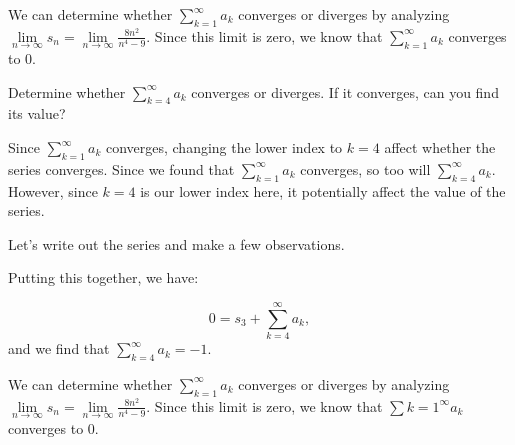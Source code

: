 \documentclass{ximera}
\begin{document}
\begin{example}
\begin{question}
\begin{explanation}
We can determine whether $\sum\limits_{k=1}^{\infty} a_k$ converges or diverges by analyzing $\lim\limits_{n \to \infty} s_n = \lim\limits_{n \to \infty} \frac{8n^2}{n^4-9}$.  Since this limit is zero, we know that $\sum\limits_{k=1}^{\infty} a_k$ converges to $0$.
\end{explanation}
\end{question}

\begin{question}
Determine whether $\sum\limits_{k=4}^{\infty} a_k$ converges or diverges.  If it converges, can you find its value?

\begin{explanation}
Since $\sum\limits_{k=1}^{\infty} a_k$ converges, changing the lower index to $k=4$   affect whether the series converges.  Since we found that $\sum\limits_{k=1}^{\infty} a_k$ converges, so too will $\sum_{k=4}^{\infty} a_k$.  However, since $k=4$ is our lower index here, it  potentially affect the value of the series.

Let's write out the series and make a few observations.

\begin{image}
  \end{image}
  
 Putting this together, we have:
 
 \[
 0 = s_3 + \sum\limits_{k=4}^{\infty} a_k,
 \] 
 and we find that $ \sum\limits_{k=4}^{\infty} a_k = -1$. 

We can determine whether $\sum\limits_{k=1}^{\infty} a_k$ converges or diverges by analyzing $\lim\limits_{n \to \infty} s_n = \lim\limits_{n \to \infty} \frac{8n^2}{n^4-9}$.  Since this limit is zero, we know that $\sum\limits{k=1}^{\infty} a_k$ converges to $0$.
\end{explanation}
\end{question}

\end{example}
\end{document}
